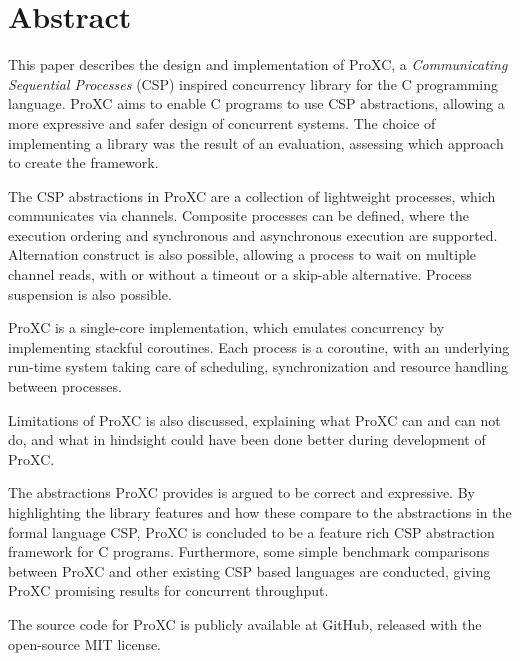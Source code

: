 
\newpage
{}
\section*{Abstract}

This paper describes the design and implementation of ProXC, a \textit{Communicating Sequential Processes} (CSP) inspired concurrency library for the C programming language. ProXC aims to enable C programs to use CSP abstractions, allowing a more expressive and safer design of concurrent systems. The choice of implementing a library was the result of an evaluation, assessing which approach to create the framework. 

The CSP abstractions in ProXC are a collection of lightweight processes, which communicates via channels. Composite processes can be defined, where the execution ordering and synchronous and asynchronous execution are supported. Alternation construct is also possible, allowing a process to wait on multiple channel reads, with or without a timeout or a skip-able alternative. Process suspension is also possible. 

ProXC is a single\hyp{}core implementation, which emulates concurrency by implementing stackful coroutines. Each process is a coroutine, with an underlying run\hyp{}time system taking care of scheduling, synchronization and resource handling between processes. 

Limitations of ProXC is also discussed, explaining what ProXC can and can not do, and what in hindsight could have been done better during development of ProXC.

The abstractions ProXC provides is argued to be correct and expressive. By highlighting the library features and how these compare to the abstractions in the formal language CSP, ProXC is concluded to be a feature rich CSP abstraction framework for C programs. Furthermore, some simple benchmark comparisons between ProXC and other existing CSP based languages are conducted, giving ProXC promising results for concurrent throughput. 

The source code for ProXC is publicly available at GitHub, released with the open\hyp{}source MIT license. 


\vfill

\afterpage{\blankpage}
